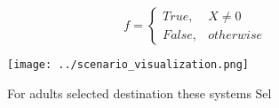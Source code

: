 \documentclass[a4paper]{article}
\begin{document}
\begin{equation}   f =
\begin{cases} True, & X \neq 0\\
False, & otherwise
\end{cases}
\end{equation}

\begin{figure}
\centering
\texttt{[image: ../scenario\_visualization.png]}
\caption{For adults selected destination these systems Sel
}
\end{figure}
 
\end{document}
